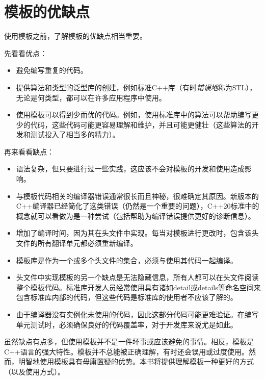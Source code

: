 \section{模板的优缺点}

使用模板之前，了解模板的优缺点相当重要。

先看看优点：

\begin{itemize}
\item
避免编写重复的代码。

\item
提供算法和类型的泛型库的创建，例如标准C++库（有时\textit{错误地}称为STL），无论是何类型，都可以在许多应用程序中使用。

\item
使用模板可以得到少而优的代码。例如，使用标准库中的算法可以帮助编写更少的代码，这些代码可能更容易理解和维护，并且可能更健壮（这些算法的开发和测试投入了相当多的精力）。
\end{itemize}

再来看看缺点：

\begin{itemize}
\item
语法复杂，但只要进行过一些实践，这应该不会对模板的开发和使用造成影响。

\item
与模板代码相关的编译器错误通常很长而且神秘，很难确定其原因。新版本的C++编译器已经简化了这类错误（仍然是一个重要的问题），C++20标准中的概念就可以看做为是一种尝试（包括帮助为编译错误提供更好的诊断信息）。

\item
增加了编译时间，因为其在头文件中实现。每当对模板进行更改时，包含该头文件的所有翻译单元都必须重新编译。

\item
模板库是作为一个或多个头文件的集合，必须与使用其代码一起编译。

\item
头文件中实现模板的另一个缺点是无法隐藏信息，所有人都可以在头文件阅读整个模板代码。标准库开发人员经常使用具有诸如detail或details等命名空间来包含标准库内部的代码，但这些代码是标准库的使用者不应该了解的。

\item
由于编译器没有实例化未使用的代码，因此这部分代码可能更难验证。在编写单元测试时，必须确保良好的代码覆盖率，对于开发库来说尤是如此。
\end{itemize}

虽然缺点有点多，但使用模板并不是一件坏事或应该避免的事情。相反，模板是C++语言的强大特性。模板并不总能被正确理解，有时还会误用或过度使用。然而，明智地使用模板具有毋庸置疑的优势。本书将提供理解模板一种更好的方式（以及使用方式）。







